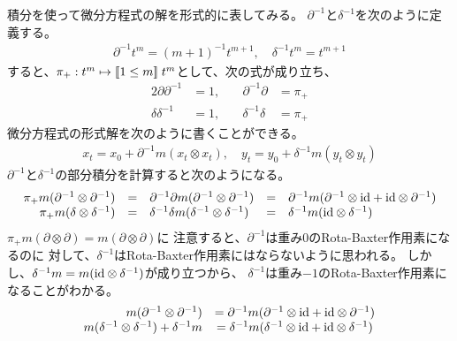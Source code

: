 {	積分を使って微分方程式の解を形式的に表してみる。
	$\partial^{-1}$と$\delta^{-1}$を次のように定義する。
	\begin{equation*}\begin{split}
		\partial^{-1}t^m = (m+1)^{-1}t^{m+1},\quad \delta^{-1}t^m = t^{m+1}
	\end{split}\end{equation*}
	すると、$\pi_+:t^m\mapsto[\![1\le m]\!]\;t^m$として、次の式が成り立ち、
	\begin{alignat*}{2}
		\partial\partial^{-1} &= 1, &\quad \partial^{-1}\partial &= \pi_+ \\
		\delta\delta^{-1} &= 1, &\quad \delta^{-1}\delta &= \pi_+
	\end{alignat*}
	微分方程式の形式解を次のように書くことができる。
	\begin{equation*}\begin{split}
		x_t = x_0 + \partial^{-1} m(x_t\otimes x_t),\quad
		y_t = y_0 + \delta^{-1} m(y_t\otimes y_t)
	\end{split}\end{equation*}
	$\partial^{-1}$と$\delta^{-1}$の部分積分を計算すると次のようになる。
	\begin{equation*}\begin{array}{rclcl}
		\pi_+m(\partial^{-1}\otimes\partial^{-1})
		&=& \partial^{-1}\partial m(\partial^{-1}\otimes\partial^{-1})
		&=& \partial^{-1}m(\partial^{-1}\otimes{\ensuremath{\operatorname{id}}} + {\operatorname{id}}\otimes\partial^{-1}) \\
		\pi_+m(\delta\otimes\delta^{-1})
		&=& \delta^{-1}\delta m(\delta^{-1}\otimes\delta^{-1})
		&=& \delta^{-1}m({\operatorname{id}}\otimes\delta^{-1}) \\
	\end{array}\end{equation*}
	$\pi_+m(\partial\otimes\partial)=m(\partial\otimes\partial)$に
	注意すると、$\partial^{-1}$は重み$0$のRota-Baxter作用素になるのに
	対して、$\delta^{-1}$はRota-Baxter作用素にはならないように思われる。
	しかし、$\delta^{-1}m=m({\operatorname{id}}\otimes\delta^{-1})$が成り立つから、
	$\delta^{-1}$は重み$-1$のRota-Baxter作用素になることがわかる。
	\begin{equation*}\begin{array}{rcll}
		m(\partial^{-1}\otimes\partial^{-1})
		&= \partial^{-1}m(\partial^{-1}\otimes{\ensuremath{\operatorname{id}}} + {\operatorname{id}}\otimes\partial^{-1}) \\
		m(\delta^{-1}\otimes\delta^{-1}) + \delta^{-1}m
		&= \delta^{-1}m(\delta^{-1}\otimes{\ensuremath{\operatorname{id}}} + {\operatorname{id}}\otimes\delta^{-1})
	\end{array}\end{equation*}
}
